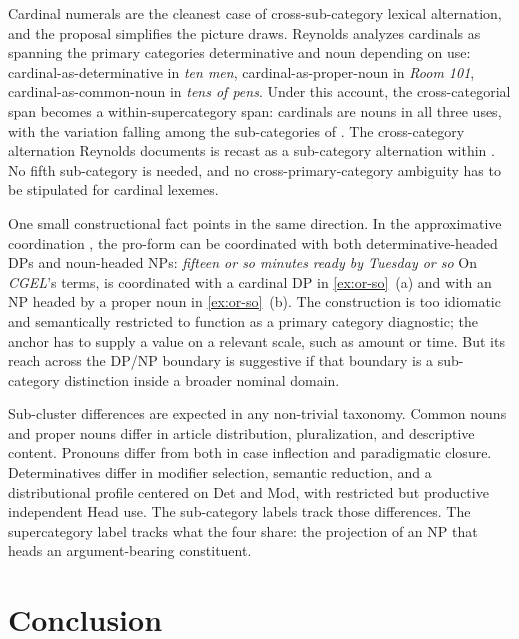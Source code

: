 \documentclass[12pt]{article}
\begin{document}
Cardinal numerals are the cleanest case of cross-sub-category lexical alternation, and the proposal simplifies the picture \citet{reynolds2026numerals} draws. Reynolds analyzes cardinals as spanning the primary categories determinative and noun depending on use: cardinal-as-determinative in \textit{ten men}, cardinal-as-proper-noun in \textit{Room 101}, cardinal-as-common-noun in \textit{tens of pens}. Under this account, the cross-categorial span becomes a within-supercategory span: cardinals are nouns in all three uses, with the variation falling among the sub-categories of . The cross-category alternation Reynolds documents is recast as a sub-category alternation within . No fifth sub-category is needed, and no cross-primary-category ambiguity has to be stipulated for cardinal lexemes.

One small constructional fact points in the same direction. In the approximative coordination , the pro-form  can be coordinated with both determinative-headed DPs and noun-headed NPs:
\ea\label{ex:or-so}
\ea \textit{fifteen or so minutes}
\ex \textit{ready by Tuesday or so}
\z
\z
On \textit{CGEL}'s terms,  is coordinated with a cardinal DP in \ref{ex:or-so}~(a) and with an NP headed by a proper noun in \ref{ex:or-so}~(b). The construction is too idiomatic and semantically restricted to function as a primary category diagnostic; the anchor has to supply a value on a relevant scale, such as amount or time. But its reach across the DP/NP boundary is suggestive if that boundary is a sub-category distinction inside a broader nominal domain.

Sub-cluster differences are expected in any non-trivial taxonomy. Common nouns and proper nouns differ in article distribution, pluralization, and descriptive content. Pronouns differ from both in case inflection and paradigmatic closure. Determinatives differ in modifier selection, semantic reduction, and a distributional profile centered on Det and Mod, with restricted but productive independent Head use. The sub-category labels track those differences. The supercategory label tracks what the four share: the projection of an NP that heads an argument-bearing constituent.

\section{Conclusion}\label{sec:conclusion}
\end{document}
